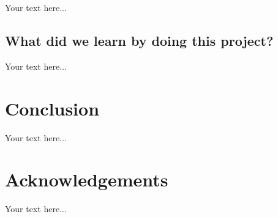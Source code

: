 \documentclass[accepted,single]{gipaper}
\begin{document}
Your text here...

\subsection{What did we learn by doing this project? }

Your text here...


\section{Conclusion}

Your text here...


\section*{Acknowledgements}

Your text here...




\end{document}
